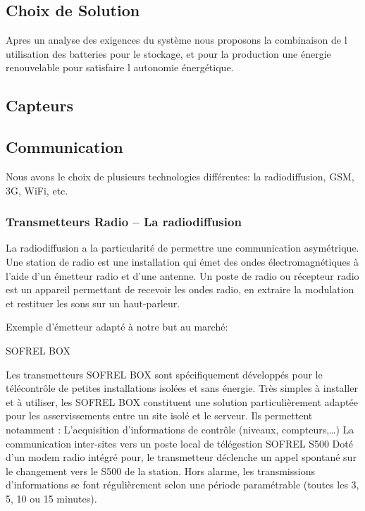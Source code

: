 \subsection{Choix de Solution}
Apres un analyse des exigences du syst\`eme nous proposons la combinaison de l utilisation des batteries pour le stockage, et pour la production une \'{e}nergie renouvelable pour satisfaire l autonomie \'{e}nerg\'{e}tique.

\subsection{Capteurs}

\subsection{Communication}

Nous avons le choix de plusieurs technologies différentes: la radiodiffusion, GSM, 3G, WiFi, etc.

\subsubsection{Transmetteurs Radio – La radiodiffusion}

La radiodiffusion a la particularité de permettre une communication asymétrique. 
Une station de radio est une installation qui émet des ondes électromagnétiques à l'aide d'un émetteur radio et d'une antenne. 
Un poste de radio ou récepteur radio est un appareil permettant de recevoir les ondes radio, en extraire la modulation et restituer les sons sur un haut-parleur. 

Exemple d'émetteur adapté à notre but au marché: 

SOFREL BOX

\begin{figure}
\begin{center}


\end{center}
\end{figure}

Les transmetteurs SOFREL BOX sont spécifiquement développés pour le télécontrôle de petites installations isolées et sans énergie.
Très simples à installer et à utiliser, les SOFREL BOX constituent une solution particulièrement adaptée pour les asservissements entre un site isolé et le serveur.
Ils permettent notamment :
L’acquisition d’informations de contrôle (niveaux, compteurs,…)
La communication inter-sites vers un poste local de télégestion SOFREL S500
Doté d’un modem radio intégré pour, le transmetteur déclenche un appel spontané sur le changement vers le S500 de la station.
Hors alarme, les transmissions d’informations se font régulièrement selon une période paramétrable (toutes les 3, 5, 10 ou 15 minutes).

